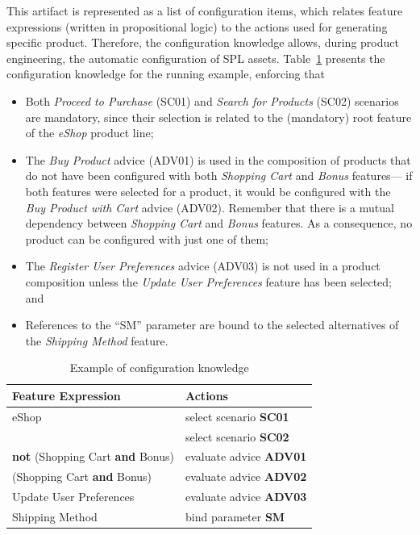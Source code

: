 \documentclass{acm_proc_article-sp}
\begin{document}
This artifact is represented as a list of configuration items, which relates
feature expressions (written in propositional logic) to the actions used for
generating specific product. Therefore, the configuration knowledge allows,
during product engineering, the automatic configuration of SPL assets.
Table~\ref{tab:eshop-ck} presents the configuration
knowledge for the running example, enforcing that


\begin{itemize}
\item Both \emph{Proceed to Purchase} (SC01) and \emph{Search for Products}
(SC02) scenarios are mandatory, since their selection is related to the
(mandatory) root feature of the \emph{eShop} product line;

\item The \emph{Buy Product} advice (ADV01) is used in the composition of
products that do not have been configured with both \emph{Shopping Cart} and \emph{Bonus}
features--- if both features were selected for a product, it would be configured
with the \emph{Buy Product with Cart} advice (ADV02). Remember that there is a
mutual dependency between \emph{Shopping Cart} and \emph{Bonus} features. As a
consequence, no product can be configured with just one of them;

\item The \emph{Register User Preferences} advice (ADV03) is not used in a
product composition unless the \emph{Update User Preferences} feature has been
selected; and

\item References to the ``SM'' parameter are bound to the
selected alternatives of the \emph{Shipping Method} feature.

\end{itemize}


\begin{table}[htb]
\begin{small}
\begin{tabular}{|lp{1.4in}|}
\hline
Feature Expression  						& Actions					 \\ \hline

eShop										& select scenario {\bf SC01} \\
											& select scenario {\bf SC02} \\	\hline 
{\bf not} (Shopping Cart {\bf and} Bonus) 	& evaluate advice {\bf ADV01} \\
\hline (Shopping Cart {\bf and} Bonus) 		& evaluate advice {\bf ADV02} 	\\
\hline Update User Preferences 				& evaluate advice {\bf ADV03} \\ \hline
Shipping Method								& bind parameter {\bf SM}\\ \hline
								
\end{tabular}
\end{small}
\caption{Example of configuration knowledge}
\label{tab:eshop-ck}
\end{table}
\end{document}
